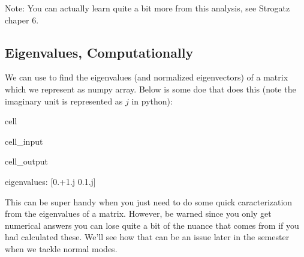 \documentclass[letterpaper,10pt,english]{jupyterBook}
\begin{document}
\sphinxAtStartPar
Note: You can actually learn quite a bit more from this analysis, see Strogatz chaper 6.


\subsection{Eigenvalues, Computationally}
\label{\detokenize{content/1_mechanics/dynamical_2:eigenvalues-computationally}}
\sphinxAtStartPar
We can use  to find the eigenvalues (and normalized eigenvectors) of a matrix which we represent as numpy array. Below is some doe that does this (note the imaginary unit is represented as \(j\) in python):

\begin{sphinxuseclass}{cell}\begin{sphinxVerbatimInput}

\begin{sphinxuseclass}{cell_input}
\begin{sphinxVerbatim}[commandchars=\\\{\}]
   
  \PYG{p}{[}\PYG{p}{[}\PYG{p}{]}\PYG{p}{[}\PYG{p}{]}\PYG{p}{]}
  \PYG{p}{[}\PYG{p}{]}
  \PYG{p}{[}\PYG{p}{]}

 
\end{sphinxVerbatim}

\end{sphinxuseclass}\end{sphinxVerbatimInput}
\begin{sphinxVerbatimOutput}

\begin{sphinxuseclass}{cell_output}
\begin{sphinxVerbatim}[commandchars=\\\{\}]
eigenvalues: [0.+1.j 0.\PYGZhy{}1.j]
\end{sphinxVerbatim}

\end{sphinxuseclass}\end{sphinxVerbatimOutput}

\end{sphinxuseclass}
\sphinxAtStartPar
This can be super handy when you just need to do some quick caracterization from the eigenvalues of a matrix. However, be warned \sphinxhyphen{} since you only get numerical answers you can lose quite a bit of the nuance that comes from if you had calculated these. We’ll see how that can be an issue later in the semester when we tackle normal modes.
\end{document}
